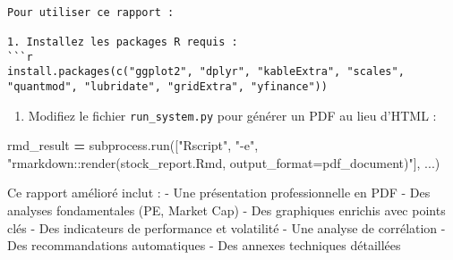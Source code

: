\documentclass[
]{article}
\newenvironment{Shaded}{\begin{snugshade}}{\end{snugshade}}
\newcommand{\NormalTok}[1]{#1}
\newcommand{\OperatorTok}[1]{\textcolor[rgb]{0.81,0.36,0.00}{\textbf{#1}}}
\newcommand{\StringTok}[1]{\textcolor[rgb]{0.31,0.60,0.02}{#1}}
\providecommand{\tightlist}{%
  \setlength{\itemsep}{0pt}\setlength{\parskip}{0pt}}
\begin{document}
\begin{verbatim}

Pour utiliser ce rapport :

1. Installez les packages R requis :
```r
install.packages(c("ggplot2", "dplyr", "kableExtra", "scales", "quantmod", "lubridate", "gridExtra", "yfinance"))
\end{verbatim}

\begin{enumerate}
\def\labelenumi{\arabic{enumi}.}
\setcounter{enumi}{1}
\tightlist
\item
  Modifiez le fichier \texttt{run\_system.py} pour générer un PDF au
  lieu d'HTML :
\end{enumerate}

\begin{Shaded}
\begin{Highlighting}[]
\NormalTok{rmd\_result }\OperatorTok{=}\NormalTok{ subprocess.run([}\StringTok{"Rscript"}\NormalTok{, }\StringTok{"{-}e"}\NormalTok{, }\StringTok{"rmarkdown::render(\textquotesingle{}stock\_report.Rmd\textquotesingle{}, output\_format=\textquotesingle{}pdf\_document\textquotesingle{})"}\NormalTok{], ...)}
\end{Highlighting}
\end{Shaded}

Ce rapport amélioré inclut : - Une présentation professionnelle en PDF -
Des analyses fondamentales (PE, Market Cap) - Des graphiques enrichis
avec points clés - Des indicateurs de performance et volatilité - Une
analyse de corrélation - Des recommandations automatiques - Des annexes
techniques détaillées
\end{document}
